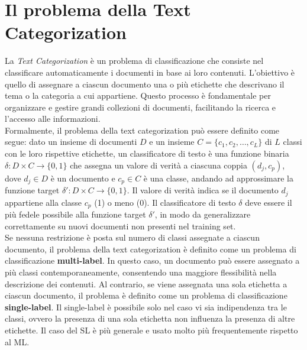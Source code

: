 \documentclass{report}
\begin{document}
	\section{Il problema della Text Categorization}
	La \textit{Text Categorization} è un problema di classificazione che consiste nel classificare automaticamente i documenti in base ai loro contenuti. L'obiettivo è quello di assegnare a ciascun documento una o più etichette che descrivano il tema o la categoria a cui appartiene. Questo processo è fondamentale per organizzare e gestire grandi collezioni di documenti, facilitando la ricerca e l'accesso alle informazioni.
	\vspace{\baselineskip}\\
	Formalmente, il problema della text categorization può essere definito come segue: dato un insieme di documenti $D$ e un insieme $C = \{c_1, c_2, \ldots, c_L\}$ di $L$ classi con le loro rispettive etichette, un classificatore di testo è una funzione binaria $\delta: D \times C \rightarrow \{0, 1\}$ che assegna un valore di verità a ciascuna coppia $(d_j, c_p)$, dove $d_j \in D$ è un documento e $c_p \in C$ è una classe, andando ad approssimare la funzione target $\delta': D \times C \rightarrow \{0,1\}$. Il valore di verità indica se il documento $d_j$ appartiene alla classe $c_p$ (1) o meno (0). Il classificatore di testo $\delta$ deve essere il più fedele possibile alla funzione target $\delta'$, in modo da generalizzare correttamente su nuovi documenti non presenti nel training set.
	\vspace{\baselineskip}\\
	Se nessuna restrizione è posta sul numero di classi assegnate a ciascun documento, il problema della text categorization è definito come un problema di classificazione \textbf{multi-label}. In questo caso, un documento può essere assegnato a più classi contemporaneamente, consentendo una maggiore flessibilità nella descrizione dei contenuti. Al contrario, se viene assegnata una sola etichetta a ciascun documento, il problema è definito come un problema di classificazione \textbf{single-label}. Il single-label è possibile solo nel caso vi sia indipendenza tra le classi, ovvero la presenza di una sola etichetta non influenza la presenza di altre etichette. Il caso del SL è più generale e usato molto più frequentemente rispetto al ML.
\end{document}
